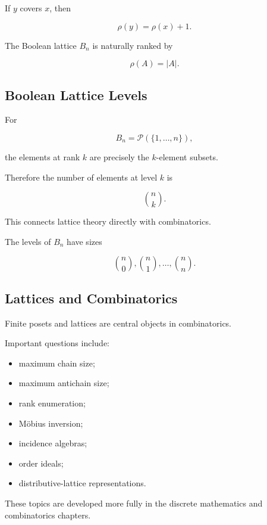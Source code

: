 If \(y\) covers \(x\), then

\[ \rho(y)=\rho(x)+1. \]

The Boolean lattice \(B_n\) is naturally ranked by

\[ \rho(A)=|A|. \]

\subsection{Boolean Lattice Levels}
\label{subsec:boolean-lattice-levels}

For

\[ B_n=\mathcal P(\{1,\ldots,n\}), \]

the elements at rank \(k\) are precisely the \(k\)-element subsets.

Therefore the number of elements at level \(k\) is

\[ \binom{n}{k}. \]

This connects lattice theory directly with combinatorics.

The levels of \(B_n\) have sizes

\[ \binom n0,\binom n1,\ldots,\binom nn. \]

\subsection{Lattices and Combinatorics}
\label{subsec:lattices-combinatorics}

Finite posets and lattices are central objects in combinatorics.

Important questions include:

\begin{itemize}
    \item maximum chain size;
    \item maximum antichain size;
    \item rank enumeration;
    \item Möbius inversion;
    \item incidence algebras;
    \item order ideals;
    \item distributive-lattice representations.
\end{itemize}

These topics are developed more fully in the discrete mathematics and
combinatorics chapters.

